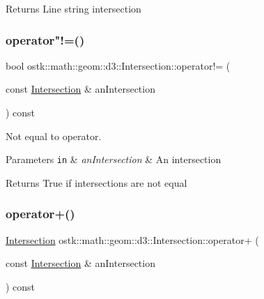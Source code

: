 \begin{DoxyReturn}{Returns}
Line string intersection 
\end{DoxyReturn}
\mbox{\label{classostk_1_1math_1_1geom_1_1d3_1_1_intersection_afab01392e8f6ecf6f6f605f24f47a3ed}} 
\subsubsection{\texorpdfstring{operator"!=()}{operator!=()}}
{\footnotesize\ttfamily bool ostk\+::math\+::geom\+::d3\+::\+Intersection\+::operator!= (\begin{DoxyParamCaption}\item[{const \hyperlink{classostk_1_1math_1_1geom_1_1d3_1_1_intersection}{Intersection} \&}]{an\+Intersection }\end{DoxyParamCaption}) const}



Not equal to operator. 


\begin{DoxyParams}[1]{Parameters}
\mbox{\tt in}  & {\em an\+Intersection} & An intersection \\
\hline
\end{DoxyParams}
\begin{DoxyReturn}{Returns}
True if intersections are not equal 
\end{DoxyReturn}
\mbox{\label{classostk_1_1math_1_1geom_1_1d3_1_1_intersection_a4c3e945ed4dac4a2fad5f08543af0097}} 
\subsubsection{\texorpdfstring{operator+()}{operator+()}}
{\footnotesize\ttfamily \hyperlink{classostk_1_1math_1_1geom_1_1d3_1_1_intersection}{Intersection} ostk\+::math\+::geom\+::d3\+::\+Intersection\+::operator+ (\begin{DoxyParamCaption}\item[{const \hyperlink{classostk_1_1math_1_1geom_1_1d3_1_1_intersection}{Intersection} \&}]{an\+Intersection }\end{DoxyParamCaption}) const}



